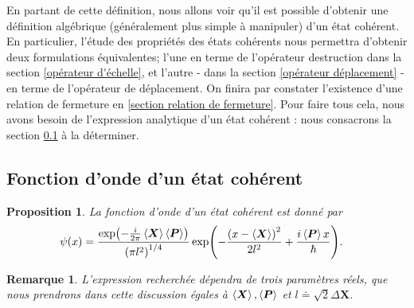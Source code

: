 \documentclass[11pt,oneside,a4paper]{article}
\newtheorem{property}[theorem]{Proposition}
\newtheorem{remark}[theorem]{Remarque}
\begin{document}
En partant de cette définition, nous allons voir qu'il est possible d'obtenir une définition algébrique (généralement plus simple à manipuler) d'un état cohérent. En particulier, l'étude des propriétés des états cohérents nous permettra d'obtenir deux formulations équivalentes; l'une en terme de l'opérateur destruction dans la section \ref{opérateur d'échelle}, et l'autre - dans la section \ref{opérateur déplacement} - en terme de l'opérateur de déplacement. On finira par constater l'existence d'une relation de fermeture en \ref{section relation de fermeture}. Pour faire tous cela, nous avons besoin de l'expression analytique d'un état cohérent : nous consacrons la section \ref{fonction d'onde d'un état cohérent} à la déterminer.

\subsection{Fonction d'onde d'un état cohérent}
\label{fonction d'onde d'un état cohérent}
\begin{property}
  La fonction d'onde d'un état cohérent est donné par
  \begin{align}
    \label{fonction d'onde}
    \psi(x) &= \frac{\exp(-\frac{i}{2\pi}\expval{\bm{X}}\expval{\bm{P}})}{\left(\pi l^2\right)^{1/4}}\exp(-\frac{\left(x-\expval{\bm{X}}\right)^2}{2l^2}+\frac{i\expval{\bm{P}}x}{\hbar}).
  \end{align}
\end{property}

\begin{remark}
  L'expression recherchée dépendra de trois paramètres réels, que nous prendrons dans cette discussion égales à $\expval{\bm{X}},\expval{\bm{P}}$ et $l \doteq \sqrt{2}\Delta\bm{X}$.
\end{remark}
\end{document}
